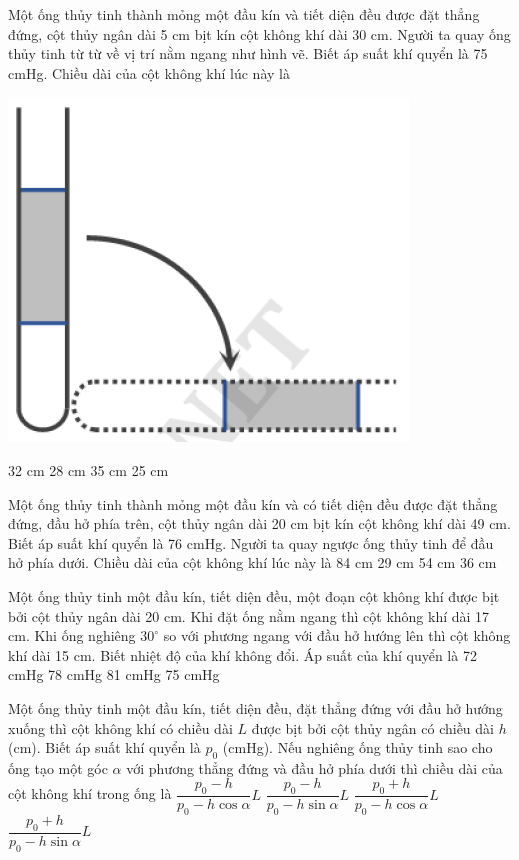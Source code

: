 \documentclass[12pt,a4paper]{article}
\begin{document}
\begin{ex}
	Một ống thủy tinh thành mỏng một đầu kín và tiết diện đều được đặt thẳng đứng, cột thủy ngân dài 5 cm bịt kín cột không khí dài 30 cm. Người ta quay ống thủy tinh từ từ về vị trí nằm ngang như hình vẽ. Biết áp suất khí quyển là 75 cmHg. Chiều dài của cột không khí lúc này là
		\begin{center}
		\includegraphics[scale=0.3]{img/6.png}
	\end{center}
	\choice
	{32 cm}
	{28 cm}
	{35 cm}
	{25 cm}
\end{ex}

\begin{ex}
	Một ống thủy tinh thành mỏng một đầu kín và có tiết diện đều được đặt thẳng đứng, đầu hở phía trên, cột thủy ngân dài 20 cm bịt kín cột không khí dài 49 cm. Biết áp suất khí quyển là 76 cmHg. Người ta quay ngược ống thủy tinh để đầu hở phía dưới. Chiều dài của cột không khí lúc này là
	\choice
	{84 cm}
	{29 cm}
	{54 cm}
	{36 cm}
\end{ex}

\begin{ex}
	Một ống thủy tinh một đầu kín, tiết diện đều, một đoạn cột không khí được bịt bởi cột thủy ngân dài 20 cm. Khi đặt ống nằm ngang thì cột không khí dài 17 cm. Khi ống nghiêng $30^\circ$ so với phương ngang với đầu hở hướng lên thì cột không khí dài 15 cm. Biết nhiệt độ của khí không đổi. Áp suất của khí quyển là
	\choice
	{72 cmHg}
	{78 cmHg}
	{81 cmHg}
	{75 cmHg}
\end{ex}

\begin{ex}
	Một ống thủy tinh một đầu kín, tiết diện đều, đặt thẳng đứng với đầu hở hướng xuống thì cột không khí có chiều dài $L$ được bịt bởi cột thủy ngân có chiều dài $h$ (cm). Biết áp suất khí quyển là $p_0$ (cmHg). Nếu nghiêng ống thủy tinh sao cho ống tạo một góc $\alpha$ với phương thẳng đứng và đầu hở phía dưới thì chiều dài của cột không khí trong ống là
	\choice
	{$\dfrac{p_0-h}{p_0-h\cos\alpha}L$}
	{$\dfrac{p_0-h}{p_0-h\sin\alpha}L$}
	{$\dfrac{p_0+h}{p_0-h\cos\alpha}L$}
	{$\dfrac{p_0+h}{p_0-h\sin\alpha}L$}
\end{ex}
\end{document}
